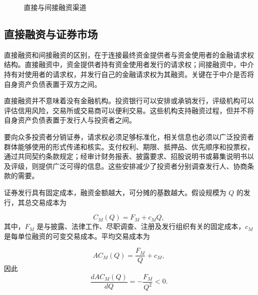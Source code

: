 \begin{figure}[htbp]

\caption{直接与间接融资渠道}
\label{fig:ch4-direct-indirect-finance}
\end{figure}

\subsection{直接融资与证券市场}

直接融资和间接融资的区别，在于连接最终资金提供者与资金使用者的金融请求权结构。直接融资中，资金提供者持有资金使用者发行的请求权；间接融资中，中介持有对使用者的请求权，并发行自己的金融请求权为其融资。关键在于中介是否将自身资产负债表置于双方之间。

直接融资并不意味着没有金融机构。投资银行可以安排或承销发行，评级机构可以评估信用风险，交易所或交易商可以便利交易。这些机构支持融资过程，但并不将自身资产负债表置于发行人与投资者之间。

要向众多投资者分销证券，请求权必须足够标准化，相关信息也必须以广泛投资者群体能够使用的形式传递和核实。支付权利、期限、抵押品、优先顺序和投票权，通过共同契约条款规定；经审计财务报表、披露要求、招股说明书或募集说明书以及评级，则提供广泛可得的信息。这些安排减少了投资者分别调查发行人、协商条款的需要。

证券发行具有固定成本，融资金额越大，可分摊的基数越大。假设规模为 $Q$ 的发行，其总交易成本为

\begin{equation}
C_M(Q)=F_M+c_MQ,
\label{eq:ch4-market-financing-cost}
\end{equation}
其中，$F_M$ 是与披露、法律工作、尽职调查、注册及发行组织有关的固定成本，$c_M$ 是每单位融资的可变交易成本。平均交易成本为

\begin{equation}
AC_M(Q)=\frac{F_M}{Q}+c_M,
\label{eq:ch4-market-average-cost}
\end{equation}
因此
\begin{equation}
\frac{dAC_M(Q)}{dQ}
=-\frac{F_M}{Q^2}
<0.
\label{eq:ch4-market-scale-effect}
\end{equation}

